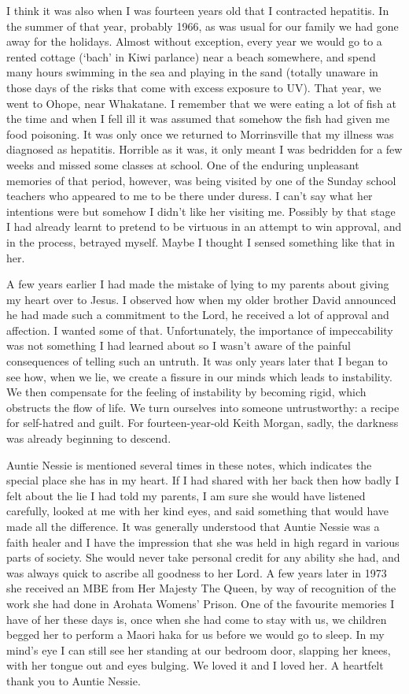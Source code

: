 I think it was also when I was fourteen years old that I contracted
hepatitis. In the summer of that year, probably 1966, as was usual for
our family we had gone away for the holidays. Almost without exception,
every year we would go to a rented cottage (`bach' in Kiwi parlance)
near a beach somewhere, and spend many hours swimming in the sea and
playing in the sand (totally unaware in those days of the risks that
come with excess exposure to UV). That year, we went to Ohope, near
Whakatane. I remember that we were eating a lot of fish at the time and
when I fell ill it was assumed that somehow the fish had given me food
poisoning. It was only once we returned to Morrinsville that my illness
was diagnosed as hepatitis. Horrible as it was, it only meant I was
bedridden for a few weeks and missed some classes at school. One of the
enduring unpleasant memories of that period, however, was being visited
by one of the Sunday school teachers who appeared to me to be there
under duress. I can't say what her intentions were but somehow I didn't
like her visiting me. Possibly by that stage I had already learnt to
pretend to be virtuous in an attempt to win approval, and in the
process, betrayed myself. Maybe I thought I sensed something like that
in her.

A few years earlier I had made the mistake of lying to my parents about
giving my heart over to Jesus. I observed how when my older brother
David announced he had made such a commitment to the Lord, he received a
lot of approval and affection. I wanted some of that. Unfortunately, the
importance of impeccability was not something I had learned about so I
wasn't aware of the painful consequences of telling such an untruth. It
was only years later that I began to see how, when we lie, we create a
fissure in our minds which leads to instability. We then compensate for
the feeling of instability by becoming rigid, which obstructs the flow
of life. We turn ourselves into someone untrustworthy: a recipe for
self-hatred and guilt. For fourteen-year-old Keith Morgan, sadly, the
darkness was already beginning to descend.

Auntie Nessie is mentioned several times in these notes, which indicates
the special place she has in my heart. If I had shared with her back
then how badly I felt about the lie I had told my parents, I am sure she
would have listened carefully, looked at me with her kind eyes, and said
something that would have made all the difference. It was generally
understood that Auntie Nessie was a faith healer and I have the
impression that she was held in high regard in various parts of society.
She would never take personal credit for any ability she had, and was
always quick to ascribe all goodness to her Lord. A few years later in
1973 she received an MBE from Her Majesty The Queen, by way of
recognition of the work she had done in Arohata Womens' Prison. One of
the favourite memories I have of her these days is, once when she had
come to stay with us, we children begged her to perform a Maori haka\cite{haka}
for us before we would go to sleep. In
my mind's eye I can still see her standing at our bedroom door, slapping
her knees, with her tongue out and eyes bulging. We loved it and I loved
her. A heartfelt thank you to Auntie Nessie.


